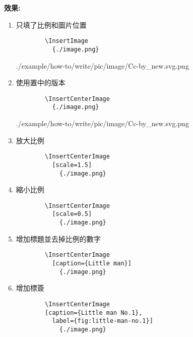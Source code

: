   \newpage
  {\bf 效果:}
  \begin{enumerate}
    \item
    {
      只填了比例和圖片位置
      \begin{verbatim}
        \InsertImage
          {./image.png}
      \end{verbatim}
      \InsertImage
        {./example/how-to/write/pic/image/Cc-by_new.svg.png}
    } %

    \item
    {
      使用置中的版本
      \begin{verbatim}
        \InsertCenterImage
          {./image.png}
      \end{verbatim}
      \InsertCenterImage
        {./example/how-to/write/pic/image/Cc-by_new.svg.png}
    } %

    \item
    {
      放大比例
      \begin{verbatim}
        \InsertCenterImage
          [scale=1.5]
            {./image.png}
      \end{verbatim}
    } %

    \newpage

    \item
    {
      縮小比例
      \begin{verbatim}
        \InsertCenterImage
          [scale=0.5]
            {./image.png}
      \end{verbatim}
    } %

    \item
    {
      增加標題並去掉比例的數字
      \begin{verbatim}
        \InsertCenterImage
          [caption={Little man}]
            {./image.png}
      \end{verbatim}
    } %

    \newpage
    \item
    {
      增加標簽
      \begin{verbatim}
        \InsertCenterImage
        [caption={Little man No.1},
          label={fig:little-man-no.1}]
            {./image.png}
      \end{verbatim}

}
\end{enumerate}
